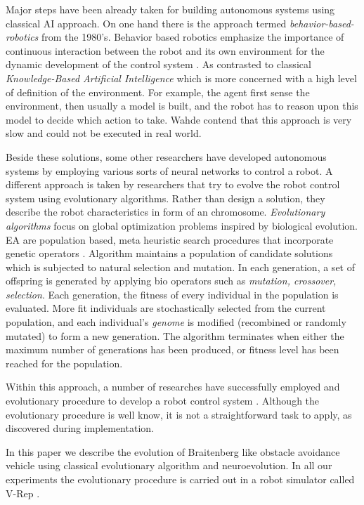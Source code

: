 \documentclass[format=acmsmall, review=false, screen=true]{acmart}
\begin{document}
Major steps have been already taken for building autonomous systems using classical AI approach. On one hand there is the approach termed \emph{behavior-based-robotics} from the 1980's\cite{arkin1998behavior}. Behavior based robotics emphasize the importance of continuous interaction between the robot and its own environment for the dynamic development of the control system \cite{siciliano2016springer}. As contrasted to classical \emph{Knowledge-Based Artificial Intelligence} which is more concerned with a high level of definition of the environment. For example, the agent first sense the environment, then usually a model is built, and the robot has to reason upon this model to decide which action to take. Wahde\cite{wahde2004evolutionary} contend that this approach is very slow and could not be executed in real world.


Beside these solutions, some other researchers have developed autonomous systems by employing various sorts of neural networks to control a robot. A  different approach is taken by researchers that try to evolve the robot control system using evolutionary algorithms. Rather than design a solution, they describe the robot characteristics in form of an chromosome. \emph{Evolutionary algorithms} \cite{back1996evolutionary} focus on global optimization problems inspired by biological evolution. EA are population based, meta heuristic search procedures that incorporate genetic operators \cite{back1996evolutionary}. Algorithm maintains a population of candidate solutions which is subjected to natural selection and mutation. In each generation, a set of offspring is generated by applying bio operators such as \emph{mutation, crossover, selection}. Each generation, the fitness of every individual in the population is evaluated. More fit individuals are stochastically selected from the current population, and each individual's \emph{genome} is modified (recombined or randomly mutated) to form a new generation. The algorithm terminates when either the maximum number of generations has been produced, or fitness level has been reached for the population.

Within this approach, a number of researches have successfully employed and evolutionary procedure to develop a robot control system \cite{salomon1999evolving}. Although the evolutionary procedure is well know, it is not a straightforward task to apply, as discovered during implementation.

In this paper we describe the evolution of Braitenberg like obstacle avoidance vehicle using classical evolutionary algorithm and neuroevolution. In all our experiments the evolutionary procedure is carried out in a robot simulator called V-Rep \cite{rohmer2013v}.
\end{document}

